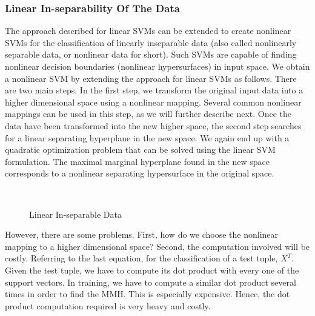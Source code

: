 \subsubsection{Linear In-separability Of The Data}
The approach described for linear SVMs can be extended to create nonlinear SVMs for the classification of linearly inseparable data (also called nonlinearly separable data, or nonlinear data for short). Such SVMs are capable of finding nonlinear decision boundaries (nonlinear hypersurfaces) in input space. We obtain a nonlinear SVM by extending the approach for linear SVMs as follows. There are two main steps. In the first step, we transform the original input data into a higher dimensional space using a nonlinear mapping. Several common nonlinear mappings can be used in this step, as we will further describe next. Once the data have been transformed into the new higher space, the second step searches for a linear separating hyperplane in the new space. We again end up with a quadratic optimization problem that can be solved using the linear SVM formulation. The maximal marginal hyperplane found in the new space corresponds to a nonlinear separating hypersurface in the original space.\bigskip
\begin{figure}[h]
\begin{dBox}
\centering
  \mbox{
   }
   \caption{Linear In-separable Data \cite{classifications}\label{fig:svm4} }   
\end{dBox}   
\end{figure}

However, there are some problems. First, how do we choose the nonlinear mapping to a higher dimensional space? Second, the computation involved will be costly. Referring to the last equation, for the classification of a test tuple, $X^T$. Given the test tuple, we have to compute its dot product with every one of the support vectors. In training, we have to compute a similar dot product several times in order to find the MMH. This is especially expensive. Hence, the dot product computation required is very heavy and costly.\bigskip

